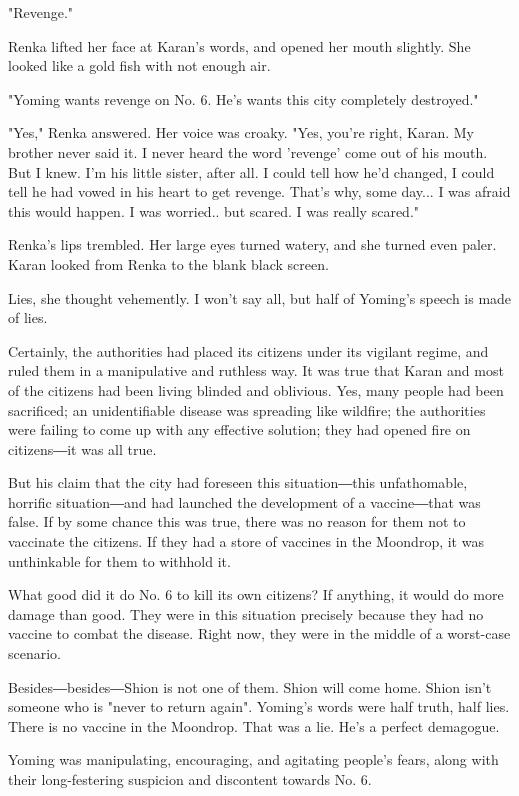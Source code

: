 "Revenge."

Renka lifted her face at Karan's words, and opened her mouth slightly.
She looked like a gold fish with not enough air.

"Yoming wants revenge on No. 6. He's wants this city completely
destroyed."

"Yes," Renka answered. Her voice was croaky. "Yes, you're right, Karan.
My brother never said it. I never heard the word 'revenge' come out of
his mouth. But I knew. I'm his little sister, after all. I could tell
how he'd changed, I could tell he had vowed in his heart to get revenge.
That's why, some day... I was afraid this would happen. I was worried..
but scared. I was really scared."

Renka's lips trembled. Her large eyes turned watery, and she turned even
paler. Karan looked from Renka to the blank black screen.

Lies, she thought vehemently. I won't say all, but half of Yoming's
speech is made of lies.

Certainly, the authorities had placed its citizens under its vigilant
regime, and ruled them in a manipulative and ruthless way. It was true
that Karan and most of the citizens had been living blinded and
oblivious. Yes, many people had been sacrificed; an unidentifiable
disease was spreading like wildfire; the authorities were failing to
come up with any effective solution; they had opened fire on citizens―it
was all true.

But his claim that the city had foreseen this situation―this
unfathomable, horrific situation―and had launched the development of a
vaccine―that was false. If by some chance this was true, there was no
reason for them not to vaccinate the citizens. If they had a store of
vaccines in the Moondrop, it was unthinkable for them to withhold it.

What good did it do No. 6 to kill its own citizens? If anything, it
would do more damage than good. They were in this situation precisely
because they had no vaccine to combat the disease. Right now, they were
in the middle of a worst-case scenario.

Besides―besides―Shion is not one of them. Shion will come home. Shion
isn't someone who is "never to return again". Yoming's words were half
truth, half lies. There is no vaccine in the Moondrop. That was a lie.
He's a perfect demagogue.

Yoming was manipulating, encouraging, and agitating people's fears,
along with their long-festering suspicion and discontent towards No. 6.

